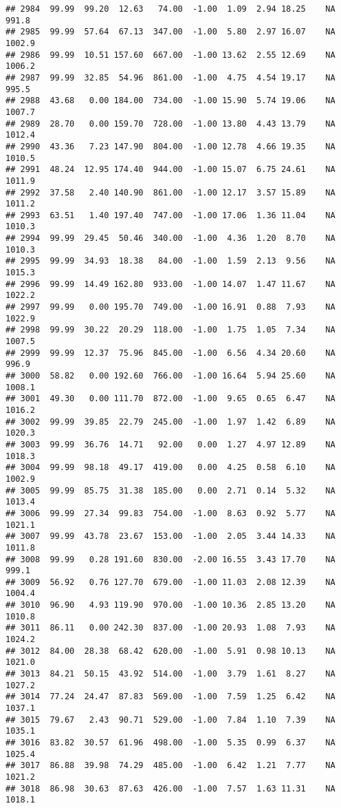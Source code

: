 \documentclass{article}\usepackage{graphicx, color}
\makeatletter
\newenvironment{kframe}{%
 \def\at@end@of@kframe{}%
 \ifinner\ifhmode%
  \def\at@end@of@kframe{\end{minipage}}%
  \begin{minipage}{\columnwidth}%
 \fi\fi%
 \def\FrameCommand##1{\hskip\@totalleftmargin \hskip-\fboxsep
 \colorbox{shadecolor}{##1}\hskip-\fboxsep
     \hskip-\linewidth \hskip-\@totalleftmargin \hskip\columnwidth}%
 \MakeFramed {\advance\hsize-\width
   \@totalleftmargin\z@ \linewidth\hsize
   \@setminipage}}%
 {\par\unskip\endMakeFramed%
 \at@end@of@kframe}
\newenvironment{knitrout}{}{} %
\makeatother
\begin{document}
\begin{knitrout}
\begin{kframe}
\begin{verbatim}
## 2984  99.99  99.20  12.63   74.00  -1.00  1.09  2.94 18.25    NA  991.8
## 2985  99.99  57.64  67.13  347.00  -1.00  5.80  2.97 16.07    NA 1002.9
## 2986  99.99  10.51 157.60  667.00  -1.00 13.62  2.55 12.69    NA 1006.2
## 2987  99.99  32.85  54.96  861.00  -1.00  4.75  4.54 19.17    NA  995.5
## 2988  43.68   0.00 184.00  734.00  -1.00 15.90  5.74 19.06    NA 1007.7
## 2989  28.70   0.00 159.70  728.00  -1.00 13.80  4.43 13.79    NA 1012.4
## 2990  43.36   7.23 147.90  804.00  -1.00 12.78  4.66 19.35    NA 1010.5
## 2991  48.24  12.95 174.40  944.00  -1.00 15.07  6.75 24.61    NA 1011.9
## 2992  37.58   2.40 140.90  861.00  -1.00 12.17  3.57 15.89    NA 1011.2
## 2993  63.51   1.40 197.40  747.00  -1.00 17.06  1.36 11.04    NA 1010.3
## 2994  99.99  29.45  50.46  340.00  -1.00  4.36  1.20  8.70    NA 1010.3
## 2995  99.99  34.93  18.38   84.00  -1.00  1.59  2.13  9.56    NA 1015.3
## 2996  99.99  14.49 162.80  933.00  -1.00 14.07  1.47 11.67    NA 1022.2
## 2997  99.99   0.00 195.70  749.00  -1.00 16.91  0.88  7.93    NA 1022.9
## 2998  99.99  30.22  20.29  118.00  -1.00  1.75  1.05  7.34    NA 1007.5
## 2999  99.99  12.37  75.96  845.00  -1.00  6.56  4.34 20.60    NA  996.9
## 3000  58.82   0.00 192.60  766.00  -1.00 16.64  5.94 25.60    NA 1008.1
## 3001  49.30   0.00 111.70  872.00  -1.00  9.65  0.65  6.47    NA 1016.2
## 3002  99.99  39.85  22.79  245.00  -1.00  1.97  1.42  6.89    NA 1020.3
## 3003  99.99  36.76  14.71   92.00   0.00  1.27  4.97 12.89    NA 1018.3
## 3004  99.99  98.18  49.17  419.00   0.00  4.25  0.58  6.10    NA 1002.9
## 3005  99.99  85.75  31.38  185.00   0.00  2.71  0.14  5.32    NA 1013.4
## 3006  99.99  27.34  99.83  754.00  -1.00  8.63  0.92  5.77    NA 1021.1
## 3007  99.99  43.78  23.67  153.00  -1.00  2.05  3.44 14.33    NA 1011.8
## 3008  99.99   0.28 191.60  830.00  -2.00 16.55  3.43 17.70    NA  999.1
## 3009  56.92   0.76 127.70  679.00  -1.00 11.03  2.08 12.39    NA 1004.4
## 3010  96.90   4.93 119.90  970.00  -1.00 10.36  2.85 13.20    NA 1010.8
## 3011  86.11   0.00 242.30  837.00  -1.00 20.93  1.08  7.93    NA 1024.2
## 3012  84.00  28.38  68.42  620.00  -1.00  5.91  0.98 10.13    NA 1021.0
## 3013  84.21  50.15  43.92  514.00  -1.00  3.79  1.61  8.27    NA 1027.2
## 3014  77.24  24.47  87.83  569.00  -1.00  7.59  1.25  6.42    NA 1037.1
## 3015  79.67   2.43  90.71  529.00  -1.00  7.84  1.10  7.39    NA 1035.1
## 3016  83.82  30.57  61.96  498.00  -1.00  5.35  0.99  6.37    NA 1025.4
## 3017  86.88  39.98  74.29  485.00  -1.00  6.42  1.21  7.77    NA 1021.2
## 3018  86.98  30.63  87.63  426.00  -1.00  7.57  1.63 11.31    NA 1018.1

\end{verbatim}
\end{kframe}
\end{knitrout}
\end{document}
